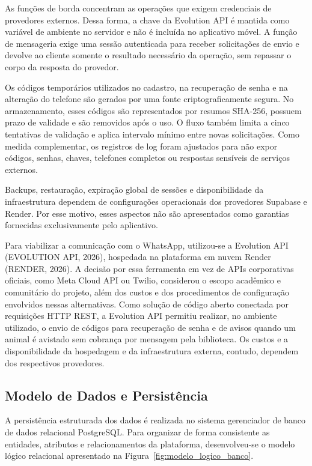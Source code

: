 As funções de borda concentram as operações que exigem credenciais de provedores externos. Dessa forma, a chave da Evolution API é mantida como variável de ambiente no servidor e não é incluída no aplicativo móvel. A função de mensageria exige uma sessão autenticada para receber solicitações de envio e devolve ao cliente somente o resultado necessário da operação, sem repassar o corpo da resposta do provedor.

Os códigos temporários utilizados no cadastro, na recuperação de senha e na alteração do telefone são gerados por uma fonte criptograficamente segura. No armazenamento, esses códigos são representados por resumos SHA-256, possuem prazo de validade e são removidos após o uso. O fluxo também limita a cinco tentativas de validação e aplica intervalo mínimo entre novas solicitações. Como medida complementar, os registros de log foram ajustados para não expor códigos, senhas, chaves, telefones completos ou respostas sensíveis de serviços externos.

Backups, restauração, expiração global de sessões e disponibilidade da infraestrutura dependem de configurações operacionais dos provedores Supabase e Render. Por esse motivo, esses aspectos não são apresentados como garantias fornecidas exclusivamente pelo aplicativo.

Para viabilizar a comunicação com o WhatsApp, utilizou-se a Evolution API (EVOLUTION API, 2026), hospedada na plataforma em nuvem Render (RENDER, 2026). A decisão por essa ferramenta em vez de APIs corporativas oficiais, como Meta Cloud API ou Twilio, considerou o escopo acadêmico e comunitário do projeto, além dos custos e dos procedimentos de configuração envolvidos nessas alternativas. Como solução de código aberto conectada por requisições HTTP REST, a Evolution API permitiu realizar, no ambiente utilizado, o envio de códigos para recuperação de senha e de avisos quando um animal é avistado sem cobrança por mensagem pela biblioteca. Os custos e a disponibilidade da hospedagem e da infraestrutura externa, contudo, dependem dos respectivos provedores.

\subsection{Modelo de Dados e Persistência}

A persistência estruturada dos dados é realizada no sistema gerenciador de banco de dados relacional PostgreSQL. Para organizar de forma consistente as entidades, atributos e relacionamentos da plataforma, desenvolveu-se o modelo lógico relacional apresentado na Figura~\ref{fig:modelo_logico_banco}.


